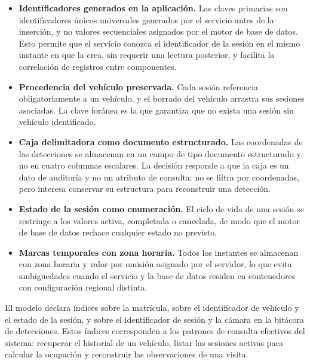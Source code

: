 \begin{itemize}
    \item \textbf{Identificadores generados en la aplicación.} Las claves
        primarias son identificadores únicos universales generados por el
        servicio antes de la inserción, y no valores secuenciales asignados por
        el motor de base de datos. Esto permite que el servicio conozca el
        identificador de la sesión en el mismo instante en que la crea, sin
        requerir una lectura posterior, y facilita la correlación de registros
        entre componentes.

    \item \textbf{Procedencia del vehículo preservada.} Cada sesión referencia
        obligatoriamente a un vehículo, y el borrado del vehículo arrastra sus
        sesiones asociadas. La clave foránea es la que garantiza que no exista
        una sesión sin vehículo identificado.

    \item \textbf{Caja delimitadora como documento estructurado.} Las
        coordenadas de las detecciones se almacenan en un campo de tipo documento
        estructurado y no en cuatro columnas escalares. La decisión responde a
        que la caja es un dato de auditoría y no un atributo de consulta: no se
        filtra por coordenadas, pero interesa conservar su estructura para
        reconstruir una detección.

    \item \textbf{Estado de la sesión como enumeración.} El ciclo de vida de una
        sesión se restringe a los valores activa, completada o cancelada, de modo
        que el motor de base de datos rechace cualquier estado no previsto.

    \item \textbf{Marcas temporales con zona horaria.} Todos los instantes se
        almacenan con zona horaria y valor por omisión asignado por el servidor,
        lo que evita ambigüedades cuando el servicio y la base de datos residen en
        contenedores con configuración regional distinta.
\end{itemize}

El modelo declara índices sobre la matrícula, sobre el identificador de vehículo
y el estado de la sesión, y sobre el identificador de sesión y la cámara en la
bitácora de detecciones. Estos índices corresponden a los patrones de consulta
efectivos del sistema: recuperar el historial de un vehículo, listar las sesiones
activas para calcular la ocupación y reconstruir las observaciones de una visita.

